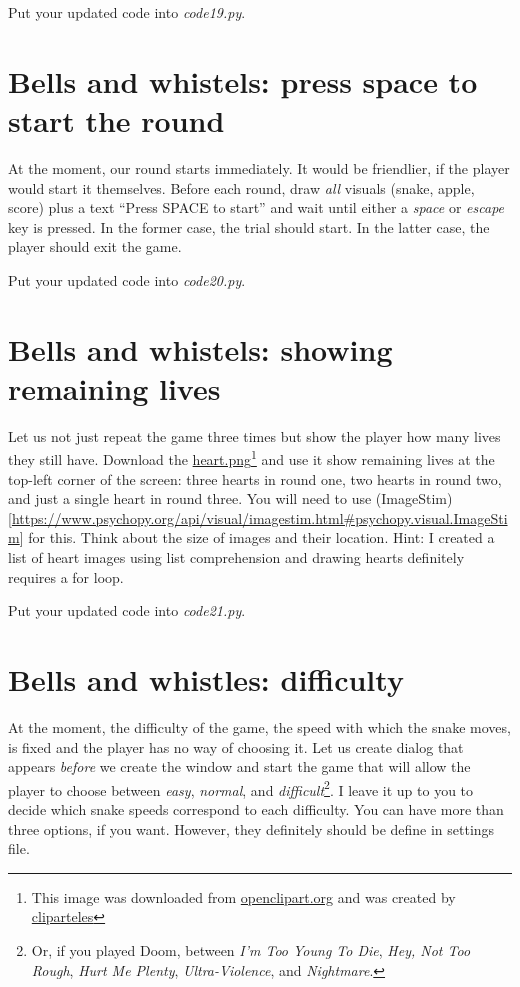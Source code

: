 \documentclass[
]{book}
\begin{document}
Put your updated code into \emph{code19.py}.

\hypertarget{bells-and-whistels-press-space-to-start-the-round}{%
\section{Bells and whistels: press space to start the round}\label{bells-and-whistels-press-space-to-start-the-round}}

At the moment, our round starts immediately. It would be friendlier, if the player would start it themselves. Before each round, draw \emph{all} visuals (snake, apple, score) plus a text ``Press SPACE to start'' and wait until either a \emph{space} or \emph{escape} key is pressed. In the former case, the trial should start. In the latter case, the player should exit the game.

Put your updated code into \emph{code20.py}.

\hypertarget{bells-and-whistels-showing-remaining-lives}{%
\section{Bells and whistels: showing remaining lives}\label{bells-and-whistels-showing-remaining-lives}}

Let us not just repeat the game three times but show the player how many lives they still have. Download the \href{material/heart.png}{heart.png}\footnote{This image was downloaded from \href{https://openclipart.org/}{openclipart.org} and was created by \href{https://openclipart.org/artist/cliparteles}{cliparteles}} and use it show remaining lives at the top-left corner of the screen: three hearts in round one, two hearts in round two, and just a single heart in round three. You will need to use (ImageStim){[}\url{https://www.psychopy.org/api/visual/imagestim.html\#psychopy.visual.ImageStim}{]} for this. Think about the size of images and their location. Hint: I created a list of heart images using list comprehension and drawing hearts definitely requires a for loop.

Put your updated code into \emph{code21.py}.

\hypertarget{bells-and-whistles-difficulty}{%
\section{Bells and whistles: difficulty}\label{bells-and-whistles-difficulty}}

At the moment, the difficulty of the game, the speed with which the snake moves, is fixed and the player has no way of choosing it. Let us create dialog that appears \emph{before} we create the window and start the game that will allow the player to choose between \emph{easy}, \emph{normal}, and \emph{difficult}\footnote{Or, if you played Doom, between \emph{I'm Too Young To Die}, \emph{Hey, Not Too Rough}, \emph{Hurt Me Plenty}, \emph{Ultra-Violence}, and \emph{Nightmare}.}. I leave it up to you to decide which snake speeds correspond to each difficulty. You can have more than three options, if you want. However, they definitely should be define in settings file.
\end{document}
